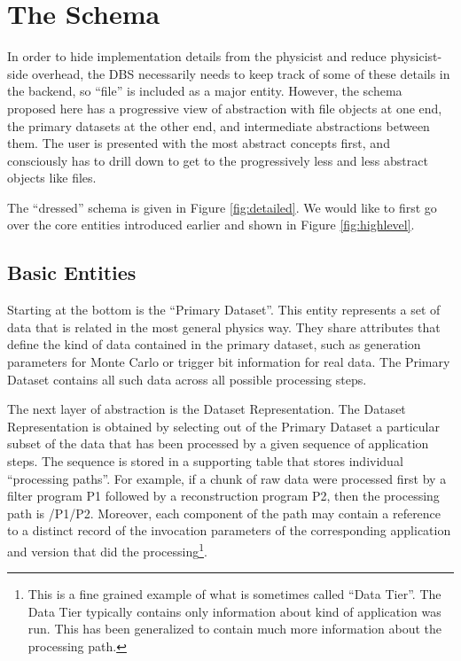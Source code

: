 \documentclass{cmspaper}
\begin{document}
\section{The Schema}

In order to hide implementation details from the physicist and 
reduce physicist-side overhead, the DBS necessarily needs to keep track of some 
of these details in the backend, so ``file'' is included as a major entity. 
However, the schema proposed here has a progressive view of abstraction 
with file objects at one end, the primary datasets at the other end, and 
intermediate abstractions between them.  The user is presented with the most
abstract concepts first, and consciously has to drill 
down to get to the progressively less and less abstract objects like files.

The ``dressed'' schema is given in Figure \ref{fig:detailed}. We 
would like to first go over the core entities introduced earlier and
shown in Figure \ref{fig:highlevel}.

\subsection{Basic Entities}

Starting at the bottom is the ``Primary Dataset''.  This entity represents a 
set of data that is related in the most general physics way.  
They share attributes that define the kind of data contained in the 
primary dataset, such as generation parameters for Monte Carlo or 
trigger bit information for real data.  The Primary Dataset contains all such
data across all possible processing steps.  

The next layer of abstraction
is the Dataset Representation.  The Dataset Representation is obtained by 
selecting out of the Primary Dataset a particular subset of the data that has been 
processed by a given sequence of application steps.  The sequence is stored 
in a supporting table that stores individual ``processing paths''.  For example,
if a chunk of raw data were processed first by a filter program P1 followed 
by a reconstruction program P2, then the processing path is /P1/P2.  Moreover, 
each component of the path may contain a reference to a distinct record of the 
invocation parameters of the corresponding application and version that did 
the processing\footnote{This is a fine grained example of what is sometimes called
``Data Tier''.  The Data Tier typically contains only information about kind
of application was run.  This has been generalized to contain much more information 
about the processing path.}. 
\end{document}
